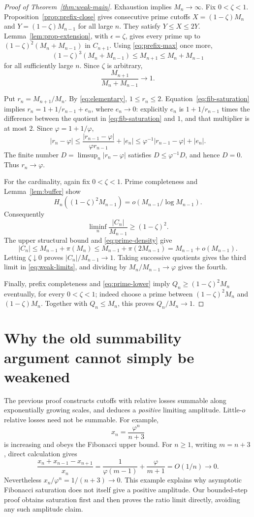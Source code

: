 \documentclass[11pt,letterpaper]{article}
\numberwithin{equation}{section}
\theoremstyle{remark}
\newcommand{\ph}{\varphi}
\begin{document}
\begin{proof}[Proof of Theorem~\ref{thm:weak-main}]
Exhaustion implies $M_n\to\infty$. Fix $0<\zeta<1$. Proposition~\ref{prop:prefix-close}
gives consecutive prime cutoffs
$X=(1-\zeta)M_n$ and $Y=(1-\zeta)M_{n-1}$ for all large $n$.
They satisfy $Y\le X\le2Y$. Lemma~\ref{lem:prop-extension}, with
$\epsilon=\zeta$, gives every prime up to
$(1-\zeta)^2(M_n+M_{n-1})$ in $C_{n+1}$.
Using \eqref{eq:prefix-max} once more,
\[
 (1-\zeta)^3(M_n+M_{n-1})\le M_{n+1}\le M_n+M_{n-1}
\]
for all sufficiently large $n$. Since $\zeta$ is arbitrary,
\begin{equation}\label{eq:fib-saturation}
 \frac{M_{n+1}}{M_n+M_{n-1}}\longrightarrow1.
\end{equation}

Put $r_n=M_{n+1}/M_n$. By \eqref{eq:elementary}, $1\le r_n\le2$.
Equation~\eqref{eq:fib-saturation} implies
$r_n=1+1/r_{n-1}+e_n$, where $e_n\to0$: explicitly $e_n$ is
$1+1/r_{n-1}$ times the difference between the quotient in
\eqref{eq:fib-saturation} and $1$, and that multiplier is at most $2$.
Since $\ph=1+1/\ph$,
\[
 |r_n-\ph|\le\frac{|r_{n-1}-\ph|}{\ph r_{n-1}}+|e_n|
 \le\ph^{-1}|r_{n-1}-\ph|+|e_n|.
\]
The finite number $D=\limsup_n|r_n-\ph|$ satisfies $D\le\ph^{-1}D$,
and hence $D=0$. Thus $r_n\to\ph$.

For the cardinality, again fix $0<\zeta<1$. Prime completeness and
Lemma~\ref{lem:buffer} show
\[
 H_n((1-\zeta)^2M_{n-1})=o(M_{n-1}/\log M_{n-1}).
\]
Consequently
\[
 \liminf_n\frac{|C_n|}{M_{n-1}}\ge(1-\zeta)^2.
\]
The upper structural bound and \eqref{eq:prime-density} give
\[
 |C_n|\le M_{n-1}+\pi(M_n)
       \le M_{n-1}+\pi(2M_{n-1})=M_{n-1}+o(M_{n-1}).
\]
Letting $\zeta\downarrow0$ proves $|C_n|/M_{n-1}\to1$.
Taking successive quotients gives the third limit in \eqref{eq:weak-limits},
and dividing by $M_n/M_{n-1}\to\ph$ gives the fourth.

Finally, prefix completeness and \eqref{eq:prime-lower} imply
$Q_n\ge(1-\zeta)^2M_n$ eventually, for every $0<\zeta<1$;
indeed choose a prime between $(1-\zeta)^2M_n$ and $(1-\zeta)M_n$.
Together with $Q_n\le M_n$, this proves $Q_n/M_n\to1$.
\end{proof}

\appendix
\section{Why the old summability argument cannot simply be weakened}

The previous proof constructs cutoffs with relative losses summable along
exponentially growing scales, and deduces a \emph{positive} limiting
amplitude. Little-$o$ relative losses need not be summable. For example,
\[
 x_n=\frac{\ph^n}{n+3}
\]
is increasing and obeys the Fibonacci upper bound. For $n\ge1$, writing
$m=n+3$, direct calculation gives
\[
 \frac{x_n+x_{n-1}-x_{n+1}}{x_n}
   =\frac1{\ph(m-1)}+\frac\ph{m+1}=O(1/n)\longrightarrow0.
\]
Nevertheless $x_n/\ph^n=1/(n+3)\to0$. This example explains why
asymptotic Fibonacci saturation does not itself give a positive amplitude.
Our bounded-step proof obtains saturation first and then proves the ratio
limit directly, avoiding any such amplitude claim.
\end{document}

